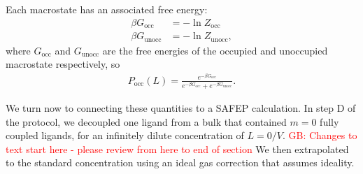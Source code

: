 \documentclass[9pt,tutorial]{Styling/livecoms}
\newcommand{\grace}[1]{\textcolor{red}{GB: #1}}
\begin{document}
Each macrostate has an associated free energy: 
\begin{align}
    \beta G_\mathrm{occ}&=-\ln Z_\mathrm{occ}\\
    \beta G_\mathrm{unocc}&=-\ln Z_\mathrm{unocc},
\end{align}
where $G_\mathrm{occ}$ and $G_\mathrm{unocc}$ are the free energies of the occupied and unoccupied macrostate respectively, so 
\begin{align}
    P_\mathrm{occ}(L)=\frac{e^{-\beta G_\mathrm{occ}}} {e^{-\beta G_\mathrm{occ}} + e^{-\beta G_\mathrm{unocc}}}.\label{eq:ApE:probability2}
\end{align}

We turn now to connecting these quantities to a SAFEP calculation.  In step D of the protocol, we decoupled one ligand from a bulk that contained $m=0$ fully coupled ligands, for an infinitely dilute concentration of $L=0/V$. \grace{Changes to text start here - please review from here to end of section} We then extrapolated to the standard concentration using an ideal gas correction that assumes ideality.
\end{document}

